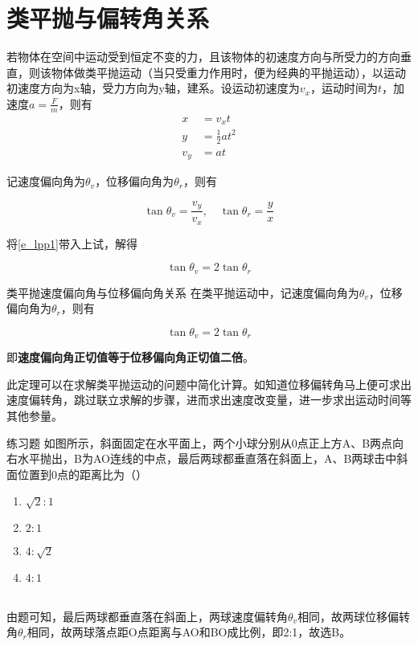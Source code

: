 \section{类平抛与偏转角关系}

若物体在空间中运动受到恒定不变的力，且该物体的初速度方向与所受力的方向垂直，则该物体做类平抛运动（当只受重力作用时，便为经典的平抛运动），以运动初速度方向为x轴，受力方向为y轴，建系。设运动初速度为$v_x$，运动时间为$t$，加速度$a = \frac{F}{m}$，则有
\begin{subequations}
\label{e_lpp1}
\begin{align}
x &= v_x t \\
y &= \frac{1}{2} a t^2 \\
v_y &= a t
\end{align}
\end{subequations}

记速度偏向角为$\theta_v$，位移偏向角为$\theta_r$，则有



$$\tan{\theta_v} = \frac{v_y}{v_x} ,\quad \tan{\theta_r} = \frac{y}{x}$$

将\eqref{e_lpp1}带入上试，解得

$$\tan{\theta_v} = 2 \tan{\theta_r}$$

\begin{theo}{类平抛速度偏向角与位移偏向角关系}{}
在类平抛运动中，记速度偏向角为$\theta_v$，位移偏向角为$\theta_r$，则有

$$\tan{\theta_v} = 2 \tan{\theta_r}$$

即\textbf{速度偏向角正切值等于位移偏向角正切值二倍}。
\end{theo}

此定理可以在求解类平抛运动的问题中简化计算。如知道位移偏转角马上便可求出速度偏转角，跳过联立求解的步骤，进而求出速度改变量，进一步求出运动时间等其他参量。

\begin{ep}{练习题}{}
如图所示，斜面固定在水平面上，两个小球分别从0点正上方A、B两点向右水平抛出，B为AO连线的中点，最后两球都垂直落在斜面上，A、B两球击中斜面位置到0点的距离比为（）

\begin{minipage}[b]{0.6\linewidth}
\begin{enumerate}[label=(\Alph*)]
  \item $\sqrt{2}:1$
  \item $2:1$
  \item $4:\sqrt{2}$
  \item $4:1$
\end{enumerate}
\end{minipage}
\hfill
\begin{minipage}[b]{0.3\linewidth}

\end{minipage}
~\\

由题可知，最后两球都垂直落在斜面上，两球速度偏转角$\theta_v$相同，故两球位移偏转角$\theta_r$相同，故两球落点距O点距离与AO和BO成比例，即2:1，故选B。
\end{ep}

